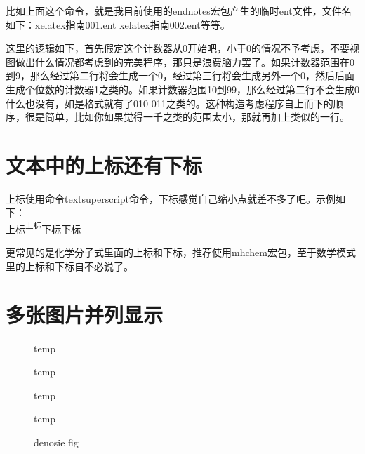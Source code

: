 \documentclass[11pt,oneside]{book}
\begin{document}
        比如上面这个命令，就是我目前使用的endnotes宏包产生的临时ent文件，文件名如下：xelatex指南001.ent xelatex指南002.ent等等。

        这里的逻辑如下，首先假定这个计数器从0开始吧，小于0的情况不予考虑，不要视图做出什么情况都考虑到的完美程序，那只是浪费脑力罢了。如果计数器范围在0到9，那么经过第二行将会生成一个0，经过第三行将会生成另外一个0，然后后面生成个位数的计数器1之类的。如果计数器范围10到99，那么经过第二行不会生成0什么也没有，如是格式就有了010 011之类的。这种构造考虑程序自上而下的顺序，很是简单，比如你如果觉得一千之类的范围太小，那就再加上类似的一行。



        \section{文本中的上标还有下标}
        上标使用命令textsuperscript命令，下标感觉自己缩小点就差不多了吧。示例如下：\\
        上标\textsuperscript{上标}下标{\scriptsize 下标}

        更常见的是化学分子式里面的上标和下标，推荐使用mhchem宏包，至于数学模式里的上标和下标自不必说了。


        \section{多张图片并列显示}
        \label{sec:多张图片并列显示}

        \begin{figure}[H]
          \label{fig:四栏图片}
          \begin{multicols}{4}
            \begin{linefig}{temp}
            \end{linefig}
            \begin{linefig}{temp}
            \end{linefig}
            \begin{linefig}{temp}
            \end{linefig}
            \begin{linefig}{temp}
            \end{linefig}
          \end{multicols}
          \caption{denosie fig}
          \label{fig:denosie fig}
        \end{figure}
\end{document}
